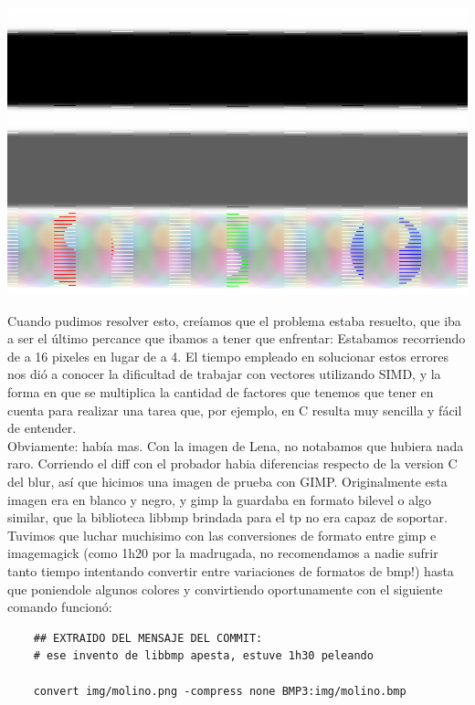 \documentclass[10pt,a4paper,spanish]{article}
\begin{document}
\begin{center}\includegraphics[width=15cm, keepaspectratio]{problema_circulos_columnas.png} \\\end{center}

Cuando pudimos resolver esto, creíamos que el problema estaba resuelto, que iba a ser el último percance que ibamos a tener que enfrentar: Estabamos recorriendo de a 16 pixeles en lugar de a 4. El tiempo empleado en solucionar estos errores nos dió a conocer la dificultad de trabajar con vectores utilizando SIMD, y la forma en que se multiplica la cantidad de factores que tenemos que tener en cuenta para realizar una tarea que, por ejemplo, en C resulta muy sencilla y fácil de entender. \\

Obviamente: había mas. Con la imagen de Lena, no notabamos que hubiera nada raro. Corriendo el diff con el probador habia diferencias respecto de la version C del blur, así que hicimos una imagen de prueba con GIMP. Originalmente esta imagen era en blanco y negro, y gimp la guardaba en formato bilevel o algo similar, que la biblioteca libbmp brindada para el tp no era capaz de soportar. Tuvimos que luchar muchisimo con las conversiones de formato entre gimp e imagemagick (como 1h20 por la madrugada, no recomendamos a nadie sufrir tanto tiempo intentando convertir entre variaciones de formatos de bmp!) hasta que poniendole algunos colores y convirtiendo oportunamente con el siguiente comando funcionó: \\

\begin{codesnippet}
\begin{verbatim}
	## EXTRAIDO DEL MENSAJE DEL COMMIT:
	# ese invento de libbmp apesta, estuve 1h30 peleando

	convert img/molino.png -compress none BMP3:img/molino.bmp
\end{verbatim}
\end{codesnippet}
\end{document}
